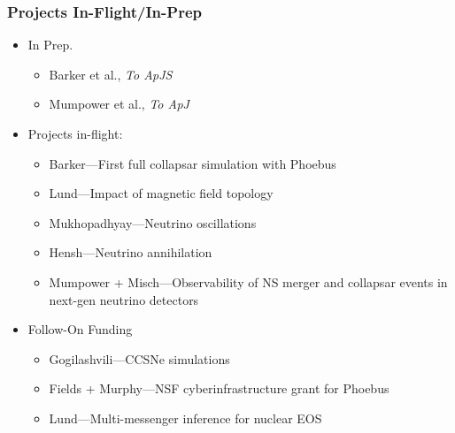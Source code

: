 \documentclass[]{beamer}
\begin{document}
\begin{frame}
  \frametitle{Projects In-Flight/In-Prep}
  \begin{itemize}
  \item In Prep.
    \begin{itemize}
    \item Barker et al., \textit{To ApJS}
    \item Mumpower et al., \textit{To ApJ}
    \end{itemize}
  \item Projects in-flight:
    \begin{itemize}
    \item Barker---First full collapsar simulation with Phoebus
    \item Lund---Impact of magnetic field topology
    \item Mukhopadhyay---Neutrino oscillations
    \item Hensh---Neutrino annihilation
    \item Mumpower + Misch---Observability of NS merger and
      collapsar events in next-gen neutrino detectors
    \end{itemize}
  \item Follow-On Funding
    \begin{itemize}
    \item Gogilashvili---CCSNe simulations
    \item Fields + Murphy---NSF cyberinfrastructure grant for Phoebus
    \item Lund---Multi-messenger inference for nuclear EOS
    \end{itemize}
  \end{itemize}
\end{frame}
\end{document}
